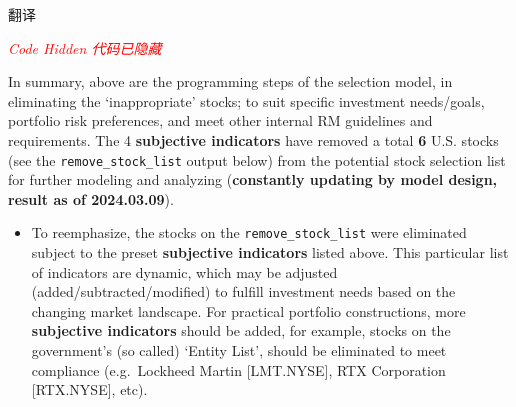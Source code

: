 \documentclass[
]{book}
\providecommand{\tightlist}{%
  \setlength{\itemsep}{0pt}\setlength{\parskip}{0pt}}
\begin{document}
翻译

\emph{\textcolor{red}{Code Hidden 代码已隐藏}}

\begin{table}[H]
\centering
\caption{\label{tab:unnamed-chunk-24}Stocks Removed by the Subjective Indicators}
\centering
{}
\end{table}

In summary, above are the programming steps of the selection model, in
eliminating the `inappropriate' stocks; to suit specific investment
needs/goals, portfolio risk preferences, and meet other internal RM
guidelines and requirements. The 4 \textbf{subjective indicators} have
removed a total \textbf{6} U.S. stocks (see the
\texttt{remove\_stock\_list} output below) from the potential stock
selection list for further modeling and analyzing (\textbf{constantly
updating by model design, result as of 2024.03.09}).

\begin{itemize}
\tightlist
\item
  To reemphasize, the stocks on the \texttt{remove\_stock\_list} were
  eliminated subject to the preset \textbf{subjective indicators} listed
  above. This particular list of indicators are dynamic, which may be
  adjusted (added/subtracted/modified) to fulfill investment needs based
  on the changing market landscape. For practical portfolio
  constructions, more \textbf{subjective indicators} should be added,
  for example, stocks on the government's (so called) `Entity List',
  should be eliminated to meet compliance (e.g.~Lockheed Martin
  {[}LMT.NYSE{]}, RTX Corporation {[}RTX.NYSE{]}, etc).
\end{itemize}
\end{document}
